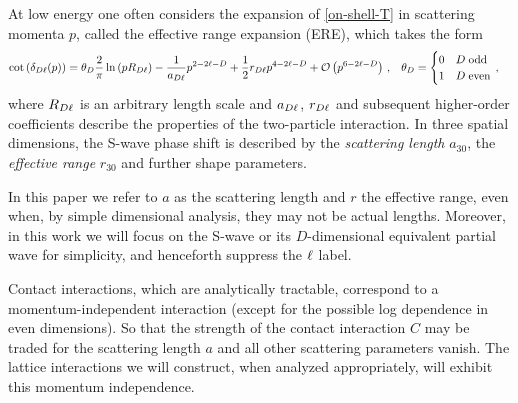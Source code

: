At low energy one often considers the expansion of \eqref{on-shell-T} in scattering momenta $p$, called the effective range expansion (ERE), which takes the form \cite{Hammer:2010fw}
\begin{align}
    \label{eq:ere}
    \cot \left(\delta_{D\ell}(p)\right)
    &=
    \theta_D \frac{2}{\pi}  \ln \left(p R_{D\ell}\right)
    -
    \frac{1}{a_{D\ell}} p^{2 - 2 \ell - D} +\frac{1}{2} r_{D\ell} p^{4 - 2 \ell - D} + \mathcal{O}\left(p^{6 - 2 \ell - D}\right)
    \, , &
    \theta_D &= \begin{cases}
        0 & D \;\text{odd} \\ 1 & D \;\text{even}
    \end{cases}
    \, ,
\end{align}
where $R_{D \ell}$ is an arbitrary length scale and $a_{D\ell}$, $r_{D\ell}$ and subsequent higher-order coefficients describe the properties of the two-particle interaction.
In three spatial dimensions, the S-wave phase shift is described by the \emph{scattering length} $a_{30}$, the \emph{effective range} $r_{30}$ and further shape parameters.

In this paper we refer to $a$ as the scattering length and $r$ the effective range, even when, by simple dimensional analysis, they may not be actual lengths.
Moreover, in this work we will focus on the S-wave or its $D$-dimensional equivalent partial wave for simplicity, and henceforth suppress the $\ell$ label.

Contact interactions, which are analytically tractable, correspond to a momentum-independent interaction (except for the possible log dependence in even dimensions).
So that the strength of the contact interaction $C$ may be traded for the scattering length $a$ and all other scattering parameters vanish.
The lattice interactions we will construct, when analyzed appropriately, will exhibit this momentum independence.
